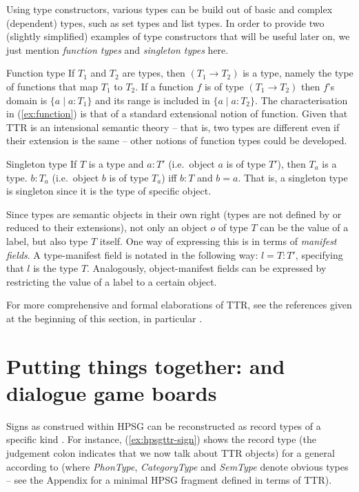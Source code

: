 \documentclass[output=paper
 	        ,biblatex
                ,babelshorthands
                ,newtxmath
                ,draftmode
                ,colorlinks, citecolor=brown
]{langscibook}
\begin{document}
Using type constructors, various types can be build out of basic and complex (dependent) types, such as set types and list types. 
%
In order to provide two (slightly simplified) examples of type constructors that will be useful later on, we just mention \emph{function types}  and \emph{singleton types}  here.

\ea Function type \label{ex:function}
\ea If $T_1$ and $T_2$ are types, then $(T_1 \rightarrow T_2)$ is a type, namely the type of functions that map $T_1$ to $T_2$.
\ex If a function $f$ is of type $(T_1 \rightarrow T_2)$ then $f$'s domain is $\{a \mid a : T_1\}$ and its range is included in $\{a \mid a : T_2\}$.
\z
\z 
%
The characterisation in (\ref{ex:function}) is that of a standard extensional notion of function. 
%
Given that TTR is an intensional semantic theory -- that is, two types are different even if their extension is the same -- other notions of function types could be developed.


\ea Singleton type
\ea If $T$ is a type and $a : T'$ (i.e.\ object $a$ is of type $T'$), then $T_a$ is a type.
\ex $b : T_a$ (i.e.\ object $b$ is of type $T_a$) iff $b : T$ and $b = a$.
\z
\z
%
That is, a singleton type is singleton since it is the type of specific object. 

Since types are semantic objects in their own right (types are not defined by or reduced to their extensions), not only an object $o$ of type $T$ can be the value of a label, but also  type $T$ itself.
%
One way of expressing this is in terms of 
\emph{manifest fields}. 
%
A type-manifest field is notated in the following way: $l=T : T'$, specifying that $l$ is the type $T$.
%
Analogously, object-manifest fields can be expressed by restricting the value of a label to a certain object.


For more comprehensive and formal elaborations of TTR, see the references given at the beginning of this section, in particular \citet{Cooper:ms}.
  



 
\section{Putting things together: \HPSGTTR and dialogue game boards}
\label{sec:hpsgttr-dialogue-game-boards}

Signs as construed within HPSG can be reconstructed as record types of a specific kind \citep{Cooper:2008}.
%
For instance, (\ref{ex:hpsgttr-sign}) shows the record type (the judgement colon indicates that we now talk about TTR objects) for a general  according to \citet{Pollard:Sag:1994} (where \emph{PhonType}, \emph{CategoryType} and \emph{SemType} denote obvious types -- see the Appendix for a minimal HPSG fragment defined in terms of TTR).
%
\ea \label{ex:hpsgttr-sign}
\z
\end{document}
